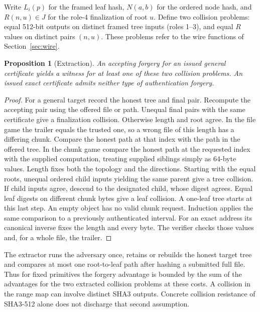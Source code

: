 \documentclass[10pt,twocolumn,letterpaper]{article}
\newtheorem{prop}{Proposition}
\begin{document}
Write \(L_i(p)\) for the framed leaf hash, \(N(a,b)\) for the ordered node hash, and \(R(n,u)\in J\) for the role-4 finalization of root \(u\). Define two collision problems: equal 512-bit outputs on distinct framed tree inputs (roles 1--3), and equal \(R\) values on distinct pairs \((n,u)\). These problems refer to the wire functions of Section~\ref{sec:wire}.
\begin{prop}[Extraction]
An accepting forgery for an issued general certificate yields a witness for at least one of these two collision problems. An issued exact certificate admits neither type of authentication forgery.
\end{prop}
\begin{proof}
For a general target record the honest tree and final pair. Recompute the accepting pair using the offered file or path. Unequal final pairs with the same certificate give a finalization collision. Otherwise length and root agree. In the file game the trailer equals the trusted one, so a wrong file of this length has a differing chunk. Compare the honest path at that index with the path in the offered tree. In the chunk game compare the honest path at the requested index with the supplied computation, treating supplied siblings simply as 64-byte values. Length fixes both the topology and the directions. Starting with the equal roots, unequal ordered child inputs yielding the same parent give a tree collision. If child inputs agree, descend to the designated child, whose digest agrees. Equal leaf digests on different chunk bytes give a leaf collision. A one-leaf tree starts at this last step. An empty object has no valid chunk request. Induction applies the same comparison to a previously authenticated interval. For an exact address its canonical inverse fixes the length and every byte. The verifier checks those values and, for a whole file, the trailer.\end{proof}
The extractor runs the adversary once, retains or rebuilds the honest target tree and compares at most one root-to-leaf path after hashing a submitted full file. Thus for fixed primitives the forgery advantage is bounded by the sum of the advantages for the two extracted collision problems at these costs. A collision in the range map can involve distinct SHA3 outputs. Concrete collision resistance of SHA3-512 alone does not discharge that second assumption.
\end{document}
